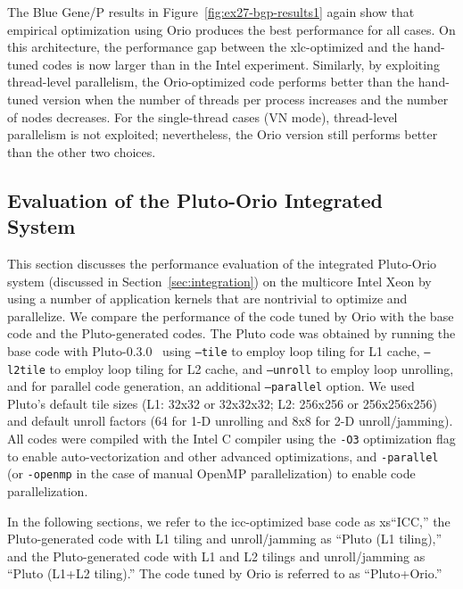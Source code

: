 The Blue Gene/P results in Figure~\ref{fig:ex27-bgp-results1} again show
that empirical optimization using Orio produces the best performance for
all cases. 
On this architecture, the performance gap between the xlc-optimized and the
hand-tuned codes is now larger than in the Intel experiment. Similarly, by
exploiting thread-level parallelism, the Orio-optimized code performs better
than the hand-tuned version when the number of threads per process increases
and the number of nodes decreases. For the single-thread cases (VN mode),
thread-level parallelism is not exploited; nevertheless, the Orio version
still performs better than the other two choices.

\subsection{Evaluation of the Pluto-Orio Integrated System} 

This section discusses the performance evaluation of the integrated
Pluto-Orio system (discussed in Section~\ref{sec:integration}) on the
multicore Intel Xeon by using a number of application kernels that are
nontrivial to optimize and parallelize. We compare the performance of the
code tuned by Orio with the base code and the Pluto-generated codes. The
Pluto code was obtained by running the base code with
Pluto-0.3.0~\cite{pluto030} using \texttt{--tile} to employ loop tiling for
L1 cache, \texttt{--l2tile} to employ loop tiling for L2 cache, and
\texttt{--unroll} to employ loop unrolling, and for parallel code generation,
an additional \texttt{--parallel} option. We used Pluto's default tile
sizes (L1: 32x32 or 32x32x32; L2: 256x256 or 256x256x256) and default
unroll factors (64 for 1-D unrolling and 8x8 for 2-D
unroll/jamming). All codes were compiled with the Intel C compiler
using the \texttt{-O3} optimization flag to enable auto-vectorization
and other advanced optimizations, and
\texttt{-parallel} (or \texttt{-openmp} in the case of manual OpenMP parallelization) 
to enable code parallelization.
 
In the following sections, we refer to the icc-optimized base code as
xs``ICC,'' the Pluto-generated code with L1 tiling and
unroll/jamming as ``Pluto (L1 tiling),'' and the Pluto-generated code with L1
and L2 tilings and unroll/jamming as ``Pluto (L1+L2 tiling).'' The code
tuned by Orio is referred to as ``Pluto+Orio.''

